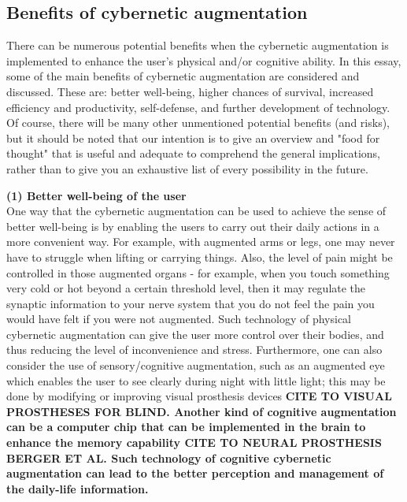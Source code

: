\subsection{Benefits of cybernetic augmentation}

There can be numerous potential benefits when the cybernetic augmentation is implemented to enhance the user's physical and/or cognitive ability. In this essay, some of the main benefits of cybernetic augmentation are considered and discussed. These are: better well-being, higher chances of survival, increased efficiency and productivity, self-defense, and further development of technology. Of course, there will be many other unmentioned potential benefits (and risks), but it should be noted that our intention is to give an overview and "food for thought" that is useful and adequate to comprehend the general implications, rather than to give you an exhaustive list of every possibility in the future. 

{\bf (1) Better well-being of the user} \\ 
One way that the cybernetic augmentation can be used to achieve the sense of better well-being is by enabling the users to carry out their daily actions in a more convenient way. For example, with augmented arms or legs, one may never have to struggle when lifting or carrying things. Also, the level of pain might be controlled in those augmented organs - for example, when you touch something very cold or hot beyond a certain threshold level, then it may regulate the synaptic information to your nerve system that you do not feel the pain you would have felt if you were not augmented. Such technology of physical cybernetic augmentation can give the user more control over their bodies, and thus reducing the level of inconvenience and stress. Furthermore, one can also consider the use of sensory/cognitive augmentation, such as an augmented eye which enables the user to see clearly during night with little light; this may be done by modifying or improving visual prosthesis devices \bf{CITE TO VISUAL PROSTHESES FOR BLIND}. Another kind of cognitive augmentation can be a computer chip that can be implemented in the brain to enhance the memory capability \bf{CITE TO NEURAL PROSTHESIS BERGER ET AL}. Such technology of cognitive cybernetic augmentation can lead to the better perception and management of the daily-life information.


